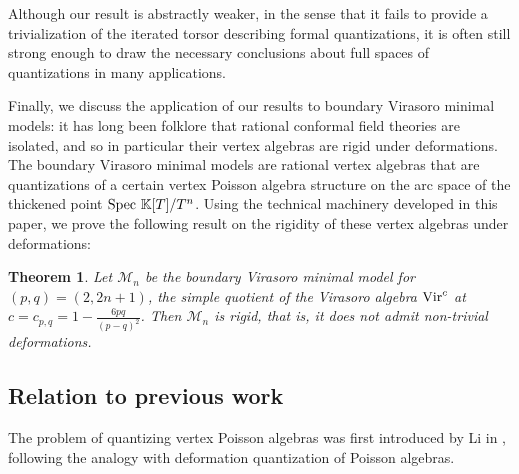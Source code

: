 \documentclass[11pt]{amsart}
\numberwithin{equation}{section}
\newtheorem{theo}{Theorem}[section]
\theoremstyle{definition}
\newcommand{\bb}{\mathbb}
\newcommand{\mc}{\mathcal}
\newcommand{\ik}{{\bb K}}
\newcommand{\Spec}{{\textup{Spec\ }}}
\newcommand{\Vir}{{\textup{Vir}}}
\newcommand{\0}{{\textbf{0}}}
\newcommand{\MM}{{\textbf{M}}}
\def\IA{\mathbb{A}}
\def\IG{\mathbb{G}}
\def\MM{{\mc M}}
\begin{document}
Although our result is abstractly weaker, in the sense that it fails to provide a trivialization of the iterated torsor describing formal quantizations, it is often still strong enough to draw the necessary conclusions about full spaces of quantizations in many applications. 




Finally, we discuss the application of our results to boundary Virasoro minimal models: it has long been folklore that rational conformal field theories are isolated, and so in particular their vertex algebras are rigid under deformations. The boundary Virasoro minimal models are rational vertex algebras that are quantizations of a certain vertex Poisson algebra structure on the arc space of the thickened point $\Spec \ik[T]/T^n$. Using the technical machinery developed in this paper, we prove the following result on the rigidity of these vertex algebras under deformations:
\begin{theo}\label{introthm:minimal model}
Let $\MM_n$ be the boundary Virasoro minimal model for $(p,q) = (2,2n+1)$, the simple quotient of the Virasoro algebra $\Vir^c$ at $c = c_{p,q} = 1- \frac{6pq}{(p-q)^2}$. Then $\MM_n$ is rigid, that is, it does not admit non-trivial deformations.
\end{theo}



\subsection{Relation to previous work}

The problem of quantizing vertex Poisson algebras was first introduced by Li in \cite{Li04}, following the analogy with deformation quantization of Poisson algebras.
\end{document}
